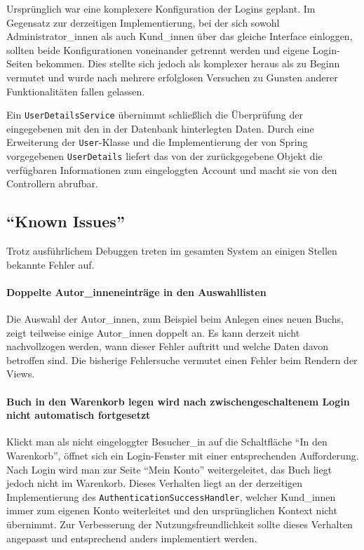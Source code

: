 	Ursprünglich war eine komplexere Konfiguration der Logins geplant. Im Gegensatz zur derzeitigen Implementierung, bei der sich sowohl Administrator\_innen als auch Kund\_innen über das gleiche Interface einloggen, sollten beide Konfigurationen voneinander getrennt werden und eigene Login-Seiten bekommen. Dies stellte sich jedoch als komplexer he\-raus als zu Beginn vermutet und wurde nach mehrere erfolglosen Versuchen zu Gunsten anderer Funktionalitäten fallen gelassen.
	
	Ein \lstinline{UserDetailsService} übernimmt schließlich die Überprüfung der eingegebenen mit den in der Datenbank hinterlegten Daten. Durch eine Erweiterung der \lstinline{User}-Klasse und die Implementierung der von Spring vorgegebenen \lstinline{UserDetails} liefert das von der zurückgegebene Objekt die verfügbaren Informationen zum eingeloggten Account und macht sie von den Controllern abrufbar.
		
	\subsection{"`Known Issues"'}
	Trotz ausführlichem Debuggen treten im gesamten System an einigen Stellen bekannte Fehler auf.
	
		\paragraph{Doppelte Autor\_inneneinträge in den Auswahllisten}
		Die Auswahl der Autor\_innen, zum Beispiel beim Anlegen eines neuen Buchs, zeigt teilweise einige Autor\_innen doppelt an. Es kann derzeit nicht nachvollzogen werden, wann dieser Fehler auftritt und welche Daten davon betroffen sind. Die bisherige Fehlersuche vermutet einen Fehler beim Rendern der Views.
		
		\paragraph{Buch in den Warenkorb legen wird nach zwischengeschaltenem Login nicht automatisch fortgesetzt}
		Klickt man als nicht eingeloggter Besucher\_in auf die Schaltfläche "`In den Warenkorb"', öffnet sich ein Login-Fenster mit einer entsprechenden Aufforderung. Nach Login wird man zur Seite "`Mein Konto"' weitergeleitet, das Buch liegt jedoch nicht im Warenkorb. Dieses Verhalten liegt an der derzeitigen Implementierung des \lstinline|AuthenticationSuccessHandler|, welcher Kund\_innen immer zum eigenen Konto weiterleitet und den ursprünglichen Kontext nicht übernimmt. Zur Verbesserung der Nutzungsfreundlichkeit sollte dieses Verhalten angepasst und entsprechend anders implementiert werden.
		

